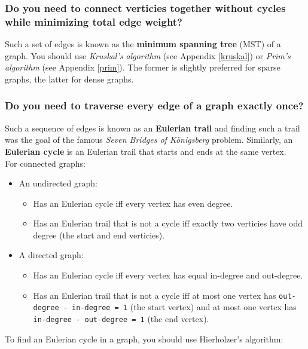 \documentclass[12pt, titlepage]{article}
\begin{document}
\subsubsection{Do you need to connect verticies together without cycles while minimizing total edge weight?}

Such a set of edges is known as the \textbf{minimum spanning tree} (MST) of a graph. You should use \textit{Kruskal's algorithm} (see Appendix \ref{kruskal}) or \textit{Prim's algorithm} (see Appendix \ref{prim}). The former is slightly preferred for sparse graphs, the latter for dense graphs.

\subsubsection{Do you need to traverse every edge of a graph exactly once?}

Such a sequence of edges is known as an \textbf{Eulerian trail} and finding such a trail was the goal of the famous \textit{Seven Bridges of K\"onigsberg} problem. Similarly, an \textbf{Eulerian cycle} is an Eulerian trail that starts and ends at the same vertex. \\

For connected graphs:
\begin{itemize}
  \item An undirected graph:
  \begin{itemize}
    \item Has an Eulerian cycle iff every vertex has even degree.
    \item Has an Eulerian trail that is not a cycle iff exactly two verticies have odd degree (the start and end verticies).
  \end{itemize}
  \item A directed graph:
  \begin{itemize}
    \item Has an Eulerian cycle iff every vertex has equal in-degree and out-degree.
    \item Has an Eulerian trail that is not a cycle iff at most one vertex has \texttt{out-degree - in-degree = 1} (the start vertex) and at most one vertex has \texttt{in-degree - out-degree = 1} (the end vertex). \medskip
  \end{itemize}
\end{itemize}

To find an Eulerian cycle in a graph, you should use Hierholzer's algorithm: \medskip
\end{document}

